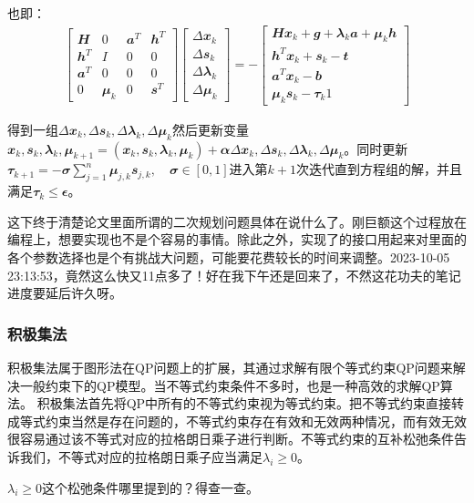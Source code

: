 也即：
\begin{align}
  \begin{bmatrix}
    \mathbfit{H} & 0& \mathbfit{a}^T & \mathbfit{h}^T\\
    \mathbfit{h}^T & I & 0 & 0\\
    \mathbfit{a}^T & 0 & 0 & 0\\
    0 & \mathbfit{\mu}_k & 0 & \mathbfit{s}^T
  \end{bmatrix}
  \begin{bmatrix}
    \Delta\mathbfit{x}_k\\
    \Delta\mathbfit{s}_k\\
    \Delta\mathbfit{\lambda}_k\\
    \Delta\mathbfit{\mu}_k
  \end{bmatrix}=-
  \begin{bmatrix}
    \mathbfit{H}\mathbfit{x}_k+\mathbfit{g}+\mathbfit{\lambda}_k\mathbfit{a}+\mathbfit{\mu}_k\mathbfit{h}\\
    \mathbfit{h}^T\mathbfit{x}_k+\mathbfit{s}_k-\mathbfit{t}\\
    \mathbfit{a}^T\mathbfit{x}_k-\mathbfit{b}\\
    \mathbfit{\mu}_k\mathbfit{s}_k-\mathbfit{\tau}_k\mathbfit{1}
  \end{bmatrix}
\end{align}

得到一组$\Delta\mathbfit{x}_k,\Delta\mathbfit{s}_k,\Delta\mathbfit{\lambda}_k,\Delta\mathbfit{\mu}_k$然后更新变量$\mathbfit{x}_k,\mathbfit{s}_k,\mathbfit{\lambda}_k,\mathbfit{\mu}_{k+1}=(\mathbfit{x}_k,\mathbfit{s}_k,\mathbfit{\lambda}_k,\mathbfit{\mu}_k)+\mathbfit{\alpha}\Delta\mathbfit{x}_k,\Delta\mathbfit{s}_k,\Delta\mathbfit{\lambda}_k,\Delta\mathbfit{\mu}_k$。同时更新$\mathbfit{\tau}_{k+1}=-\mathbfit{\sigma}\sum_{j=1}^{n}\mathbfit{\mu}_{j,k}\mathbfit{s}_{j,k}, \quad \mathbfit{\sigma} \in [0,1]$进入第$k+1$次迭代直到方程组的解，并且满足$\mathbfit{\tau}_k\leq\mathbfit{\epsilon}$。
\begin{note}
  这下终于清楚论文里面所谓的二次规划问题具体在说什么了。刚巨额这个过程放在编程上，想要实现也不是个容易的事情。除此之外，实现了的接口用起来对里面的各个参数选择也是个有挑战大问题，可能要花费较长的时间来调整。2023-10-05 23:13:53，竟然这么快又11点多了！好在我下午还是回来了，不然这花功夫的笔记进度要延后许久呀。
\end{note}




\subsubsection{积极集法}

积极集法属于图形法在QP问题上的扩展，其通过求解有限个等式约束QP问题来解决一般约束下的QP模型。当不等式约束条件不多时，也是一种高效的求解QP算法。
积极集法首先将QP中所有的不等式约束视为等式约束。把不等式约束直接转成等式约束当然是存在问题的，不等式约束存在有效和无效两种情况，而有效无效很容易通过该不等式对应的拉格朗日乘子进行判断。不等式约束的互补松弛条件告诉我们，不等式对应的拉格朗日乘子应当满足$\lambda_i\geq 0$。
\begin{note}
  $\lambda_i\geq 0$这个松弛条件哪里提到的？得查一查。
\end{note}